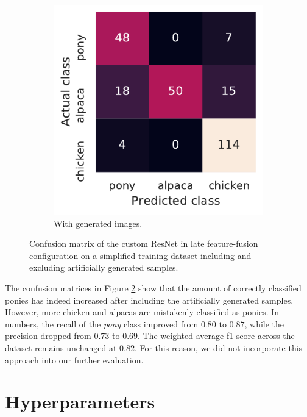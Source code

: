 \documentclass{l4proj}
\begin{document}
\begin{figure}[ht]
\begin{subfigure}[h!]{0.3\textwidth}
    \includegraphics[width=\textwidth]{images/evaluation/autoencoder/confusion_autoencoder}
    \caption{With generated images.}
    \label{fig:auto_confusion_auto}
  \end{subfigure}
  \caption{Confusion matrix of the custom ResNet in late feature-fusion configuration on a simplified training dataset including and excluding artificially generated samples.}
  \label{fig:auto_confusion}
\end{figure}

The confusion matrices in Figure \ref{fig:auto_confusion} show that the amount of correctly classified ponies has indeed increased after including the artificially generated samples. However, more chicken and alpacas are mistakenly classified as ponies. In numbers, the recall of the \textit{pony} class improved from $0.80$ to $0.87$, while the precision dropped from $0.73$ to $0.69$. The weighted average f1-score across the dataset remains unchanged at $0.82$. For this reason, we did not incorporate this approach into our further evaluation.


\section{Hyperparameters}
\end{document}
